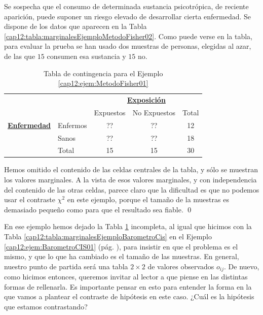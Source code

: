 \begin{ejemplo}
\label{cap12:ejem:MetodoFisher01}
Se sospecha que el consumo de determinada sustancia psicotrópica, de reciente aparición, puede suponer un riesgo elevado de desarrollar cierta enfermedad. Se dispone de los datos que aparecen en la Tabla \ref{cap12:tabla:marginalesEjemploMetodoFisher02}. Como puede verse en la tabla, para evaluar la prueba se han usado dos muestras de personas, elegidas al azar, de las que $15$ consumen esa sustancia y $15$ no.
        \begin{table}[h!]
        \begin{center}
            \begin{tabular}{llccc}
            &&\multicolumn{3}{c}{\underline{\bf Exposición}}\\

                                      &          & Expuestos &  No Expuestos& Total\\
            \cline{2-5}
          \underline{\bf Enfermedad} & Enfermos & ??&  ??&   12\\
                                      & Sanos &  ?? & ??&  18\\
            \cline{2-5}
                                      & Total    & 15& 15& 30\\
            \cline{2-5}
            \end{tabular}
        \end{center}
        \caption{Tabla de contingencia para el Ejemplo \ref{cap12:ejem:MetodoFisher01}}
        \label{cap12:tabla:marginalesEjemploMetodoFisher01}
        \end{table}
Hemos omitido el contenido de las celdas centrales de la tabla, y sólo se muestran los valores marginales. A la vista de esos valores marginales, y con independencia del contenido de las otras celdas, parece claro que la dificultad es que no podemos usar el contraste $\chi^2$ en este ejemplo, porque el tamaño de la muestras es demasiado pequeño como para que el resultado sea fiable.
\qed
\end{ejemplo}

En ese ejemplo hemos dejado la Tabla \ref{cap12:tabla:marginalesEjemploMetodoFisher01} incompleta, al igual que hicimos con la Tabla \ref{cap12:tabla:marginalesEjemploBarometroCis} en el Ejemplo \ref{cap12:ejem:BarometroCIS01} (pág. \pageref{cap12:ejem:BarometroCIS01}), para insistir en que el problema es el mismo, y que lo que ha cambiado es el tamaño de las muestras. En general, nuestro punto de partida será una tabla $2\times 2$ de valores observados $o_{ij}$. De nuevo, como hicimos  entonces, queremos invitar al lector a que piense en las distintas formas de rellenarla. Es importante pensar en esto para entender la forma en la que vamos a plantear el contraste de hipótesis en este caso. ¿Cuál es la hipótesis que estamos contrastando?

